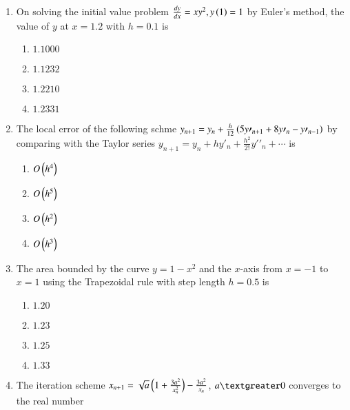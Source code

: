 \documentclass[journal]{IEEEtran}
\begin{document}
\begin{enumerate}
{\begin{multicols}{4}
\begin{enumerate}
\item $y=18-3x$
\item $y=18.1-3.1x$
\item $18.2-3.2x$
\item $18.3-3.3x$
\end{enumerate}
\end{multicols}
}
\item{
On solving the initial value problem $\frac{dy}{dx}=xy^2,y\left(1\right)=1$ by Euler's method, the value of $y$ at $x=1.2$ with $h=0.1$ is
\begin{multicols}{4}
\begin{enumerate}
\item $1.1000$
\item $1.1232$
\item $1.2210$
\item $1.2331$
\end{enumerate}
\end{multicols}
}
\item{
The local error of the following schme $y_{n+1}=y_n+\frac{h}{12}\left(5y\prime_{n+1} + 8y\prime_n - y\prime_{n-1}\right)$ by comparing with the Taylor series $y_{n+1} = y_n + hy\prime_n + \frac{h^2}{2!}y\prime\prime_n + \cdots$ is 
\begin{multicols}{4}
\begin{enumerate}
\item $O\left(h^4\right)$
\item $O\left(h^5\right)$
\item $O\left(h^2\right)$
\item $O\left(h^3\right)$
\end{enumerate}
\end{multicols}
}
\item{
The area bounded by the curve $y=1-x^2$ and the $x$-axis from $x=-1$ to $x=1$ using the Trapezoidal rule with step length $h=0.5$ is
\begin{multicols}{4}
\begin{enumerate}
\item $1.20$
\item $1.23$
\item $1.25$
\item $1.33$
\end{enumerate}
\end{multicols}
}
\item{
The iteration scheme $x_{n+1}=\sqrt{a}\left(1+\frac{3a^2}{x_n^2}\right)-\frac{3a^2}{x_n}$, $a\textgreater0$ converges to the real number
\begin{multicols}{4}
\begin{enumerate}

\end{enumerate}
\end{multicols}}
\end{enumerate}
\end{document}
